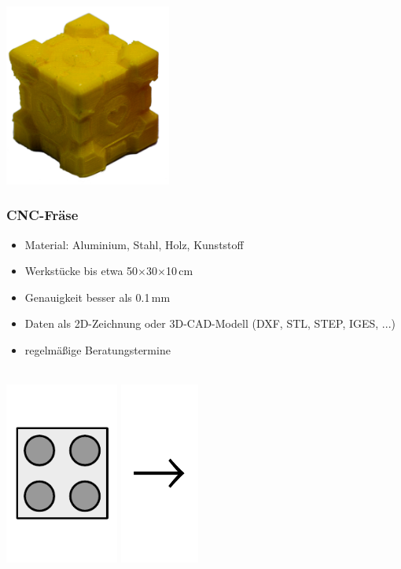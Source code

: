 \documentclass[t]{beamer}
\begin{document}
\begin{frame}
\begin{center}
        \includegraphics[height=6cm]{../img/companioncube.png}
    \end{center}
\end{frame}

\begin{frame}
    \frametitle{CNC-Fräse}
    \begin{itemize}
        \item Material: Aluminium, Stahl, Holz, Kunststoff
        \item Werkstücke bis etwa 50$\times$30$\times$10\,cm
        \item Genauigkeit besser als 0.1\,mm
        \item Daten als 2D-Zeichnung oder 3D-CAD-Modell (DXF, STL, STEP, IGES, ...)
        \item regelmäßige Beratungstermine
    \end{itemize}
    \begin{center}
    ~\\
    \includegraphics[height=6cm]{../img/legozeichnung.pdf}
    \includegraphics[height=6cm]{../img/pfeil.pdf}

\end{center}
\end{frame}
\end{document}
